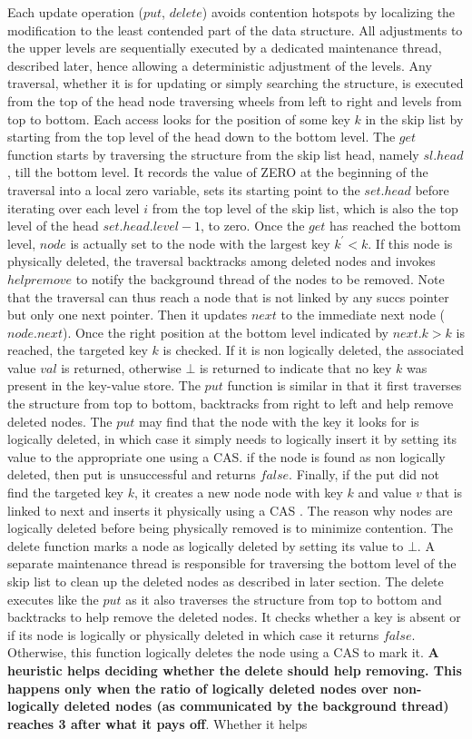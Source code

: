 \documentclass{article}
\begin{document}
Each update operation ($put$, $delete$) avoids contention hotspots by localizing the modification to the least contended part of the data structure. All adjustments to the upper levels are sequentially executed by a dedicated maintenance thread, described later, hence allowing a deterministic adjustment of the levels. Any traversal, whether it is for updating or simply searching the structure, is executed from the top of the head node traversing wheels from left to right and levels from top to bottom. Each access looks for the position of some key $k$ in the skip list by starting from the top level of the head down to the bottom level. The $get$ function starts by traversing the structure from the skip list head, namely $sl.head$, till the bottom level. It records the value of ZERO at the beginning of the traversal into a local zero variable, sets its starting point to the $set.head$ before iterating over each level $i$ from the top level of the skip list, which is also the top level of the head $set.head.level - 1$, to zero. Once the $get$ has reached the bottom level, $node$ is actually set to the node with the largest key $k^{'}< k$. If this node is physically deleted, the traversal backtracks among deleted nodes and invokes $help remove$ to notify the background thread of the nodes to be removed. Note that the traversal can thus reach a node that is not linked by any succs pointer but only one next pointer. Then it updates $next$ to the immediate next node ($node.next$). Once the right position at the bottom level indicated by $next.k > k$ is reached, the targeted key $k$ is checked. If it is non logically deleted, the associated value $val$ is returned, otherwise $\bot$ is  returned to indicate that no key $k$ was present in the key-value store. The $put$ function is similar in that it first traverses the structure from top to bottom, backtracks from right to left and help remove deleted nodes. The $put$ may find that the node with the key it looks for is logically deleted, in which case it simply needs to logically insert it by setting its value to the appropriate one using a CAS. if the node is found as non logically deleted, then put is unsuccessful and returns $false$. Finally, if the put did not find the targeted key $k$, it creates a new node node with key $k$ and value $v$ that is linked to next and inserts it physically using a CAS . The reason why nodes are logically deleted before being physically removed is to minimize contention. The delete function marks a node as logically deleted by setting its value to $\bot$. A separate maintenance thread is responsible for traversing the bottom level of the skip list to clean up the deleted nodes as described in later section. The delete executes like the $put$ as it also traverses the structure from top to bottom and backtracks to help remove the deleted nodes. It checks whether a key is absent or if its node is logically or physically deleted in which case it returns $false$. Otherwise, this function logically deletes the node using a CAS to mark it. \textbf{A heuristic helps deciding whether the delete should help removing. This happens only when the ratio of logically deleted nodes over non-logically deleted nodes (as communicated by the background thread) reaches 3 after what it pays off}. Whether it helps 
\end{document}
